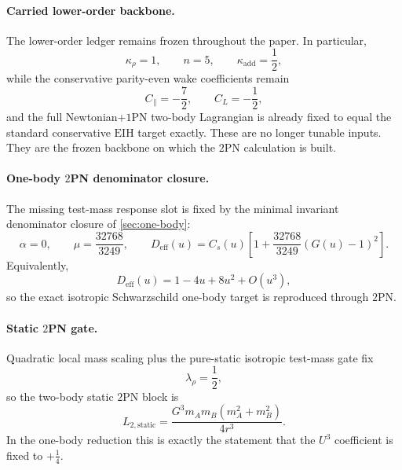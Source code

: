 \documentclass[11pt]{article}
\newcommand{\OnePN}{\mathrm{1PN}}
\newcommand{\TwoPN}{\mathrm{2PN}}
\newcommand{\EIH}{\mathrm{EIH}}
\newcommand{\eff}{\mathrm{eff}}
\newcommand{\kadd}{\kappa_{\mathrm{add}}}
\newcommand{\krho}{\kappa_{\rho}}
\begin{document}
\paragraph{Carried lower-order backbone.}
The lower-order ledger remains frozen throughout the paper.
In particular,
\begin{equation}
\krho=1,
\qquad
n=5,
\qquad
\kadd=\frac12,
\label{eq:status-carried-lower-order}
\end{equation}
while the conservative parity-even wake coefficients remain
\begin{equation}
C_\parallel=-\frac72,
\qquad
C_L=-\frac12,
\label{eq:status-carried-wake}
\end{equation}
and the full Newtonian+\(\OnePN\) two-body Lagrangian is already fixed to equal the
standard conservative \(\EIH\) target exactly.
These are no longer tunable inputs.
They are the frozen backbone on which the \(\TwoPN\) calculation is built.

\paragraph{One-body \texorpdfstring{$2$}{2}PN denominator closure.}
The missing test-mass response slot is fixed by the minimal invariant denominator
closure of \cref{sec:one-body}:
\begin{equation}
\alpha=0,
\qquad
\mu=\frac{32768}{3249},
\qquad
D_{\eff}(u)=C_s(u)\left[1+\frac{32768}{3249}(G(u)-1)^2\right].
\label{eq:status-fixed-denominator}
\end{equation}
Equivalently,
\begin{equation}
D_{\eff}(u)=1-4u+8u^2+O(u^3),
\label{eq:status-fixed-denominator-series}
\end{equation}
so the exact isotropic Schwarzschild one-body target is reproduced through
\(\TwoPN\).

\paragraph{Static \texorpdfstring{$2$}{2}PN gate.}
Quadratic local mass scaling plus the pure-static isotropic test-mass gate fix
\begin{equation}
\lambda_\rho=\frac12,
\label{eq:status-fixed-lambda-rho}
\end{equation}
so the two-body static \(\TwoPN\) block is
\begin{equation}
L_{2,\mathrm{static}}
=\frac{G^3m_A m_B(m_A^2+m_B^2)}{4r^3}.
\label{eq:status-fixed-static-block}
\end{equation}
In the one-body reduction this is exactly the statement that the \(U^3\) coefficient is
fixed to \(+\frac14\).
\end{document}
